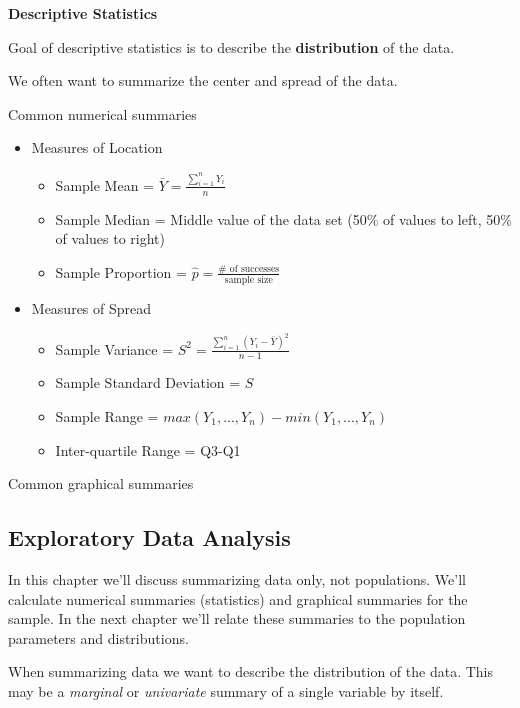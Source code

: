 \documentclass[
]{book}
\providecommand{\tightlist}{%
  \setlength{\itemsep}{0pt}\setlength{\parskip}{0pt}}
\theoremstyle{definition}
\theoremstyle{definition}
\theoremstyle{definition}
\theoremstyle{remark}
\begin{document}
\textbf{Descriptive Statistics}

Goal of descriptive statistics is to describe the \textbf{distribution} of the data.

We often want to summarize the center and spread of the data.

Common numerical summaries

\begin{itemize}
\item
  Measures of Location

  \begin{itemize}
  \tightlist
  \item
    Sample Mean = \(\bar{Y}=\frac{\sum_{i=1}^{n}Y_i}{n}\)
  \item
    Sample Median = Middle value of the data set (50\% of values to left, 50\% of values to right)
  \item
    Sample Proportion = \(\hat{p}=\frac{\#\mbox{ of successes}}{\mbox{sample size}}\)
  \end{itemize}
\item
  Measures of Spread

  \begin{itemize}
  \tightlist
  \item
    Sample Variance = \(S^2 = \frac{\sum_{i=1}^{n}(Y_i-\bar{Y})^2}{n-1}\)
  \item
    Sample Standard Deviation = \(S\)
  \item
    Sample Range = \(max(Y_1,...,Y_n)-min(Y_1,...,Y_n)\)
  \item
    Inter-quartile Range = Q3-Q1
  \end{itemize}
\end{itemize}

Common graphical summaries

\hypertarget{exploratory-data-analysis}{%
\subsection{Exploratory Data Analysis}\label{exploratory-data-analysis}}

In this chapter we'll discuss summarizing data only, not populations. We'll calculate numerical summaries (statistics) and graphical summaries for the sample. In the next chapter we'll relate these summaries to the population parameters and distributions.

When summarizing data we want to describe the distribution of the data. This may be a \emph{marginal} or \emph{univariate} summary of a single variable by itself.
\end{document}
